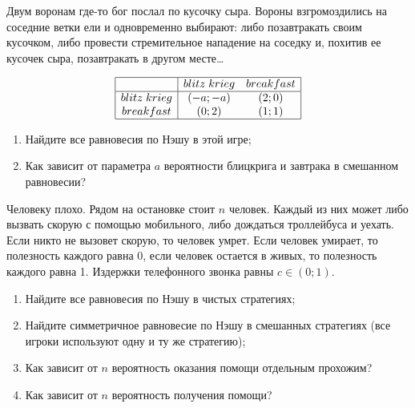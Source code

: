 \begin{problem}
Двум воронам где-то бог послал по кусочку сыра. Вороны взгромоздились на соседние ветки ели и одновременно выбирают: либо позавтракать своим кусочком, либо провести стремительное нападение на соседку и, похитив ее кусочек сыра, позавтракать в другом месте\ldots \par
\[\begin{array}{|c|cc|}
\hline
{} & {blitz\; krieg} & {breakfast} \\
\hline
{blitz\; krieg} & {\left(-a;-a\right)} & {\left(2;0\right)} \\
{breakfast} & {\left(0;2\right)} & {\left(1;1\right)} \\
\hline
\end{array}\]
\begin{enumerate}
\item Найдите все равновесия по Нэшу в этой игре;\par
\item Как зависит от параметра  $a$  вероятности блицкрига и завтрака в смешанном равновесии?\par
\end{enumerate}



\begin{sol}

\end{sol}
\end{problem}



\begin{problem}

Человеку плохо. Рядом на остановке стоит $n$  человек. Каждый из них может либо вызвать скорую с помощью мобильного, либо дождаться троллейбуса и уехать. Если никто не вызовет скорую, то человек умрет. Если человек умирает, то полезность каждого равна 0, если человек остается в живых, то полезность каждого равна 1. Издержки телефонного звонка равны  $c\in \left(0;1\right)$.\par
\begin{enumerate}
\item Найдите все равновесия по Нэшу в чистых стратегиях;\par
\item Найдите симметричное равновесие по Нэшу в смешанных стратегиях (все игроки используют одну и ту же стратегию);\par
\item  Как зависит от  $n$  вероятность оказания помощи отдельным прохожим?\par
\item Как зависит от  $n$  вероятность получения помощи?\par
\end{enumerate}



\begin{sol}

\end{sol}
\end{problem}



